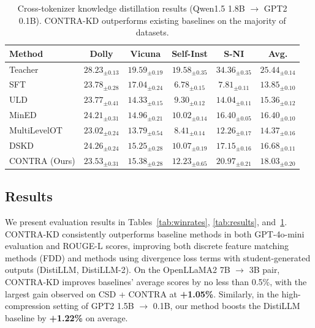 \documentclass{article} %
\theoremstyle{definition}
\theoremstyle{remark}
\begin{document}
\begin{table}[t]
\centering
\small
\caption{Cross-tokenizer knowledge distillation results (Qwen1.5 1.8B $\rightarrow$ GPT2 0.1B). CONTRA-KD outperforms existing baselines on the majority of datasets.}
\label{tab:ctkd_results}
\vspace{0.5em}
\begin{tabular}{lccccc}
\toprule
\textbf{Method} & \textbf{Dolly} & \textbf{Vicuna} & \textbf{Self-Inst} & \textbf{S-NI} & \textbf{Avg.} \\
\midrule
Teacher & $28.23_{\pm 0.13}$ & $19.59_{\pm 0.19}$ & $19.58_{\pm 0.35}$ & $34.36_{\pm 0.35}$ & $25.44_{\pm 0.14}$ \\
SFT & $23.78_{\pm 0.28}$ & $17.04_{\pm 0.24}$ & $6.78_{\pm 0.15}$ & $7.81_{\pm 0.11}$ & $13.85_{\pm 0.10}$ \\
\midrule
ULD & $23.77_{\pm 0.41}$ & $14.33_{\pm 0.15}$ & $9.30_{\pm 0.12}$ & $14.04_{\pm 0.11}$ & $15.36_{\pm 0.12}$ \\
MinED & $24.21_{\pm 0.31}$ & $14.96_{\pm 0.21}$ & $10.02_{\pm 0.14}$ & $16.40_{\pm 0.05}$ & $16.40_{\pm 0.10}$ \\
MultiLevelOT & $23.02_{\pm 0.24}$ & $13.79_{\pm 0.54}$ & $8.41_{\pm 0.14}$ & $12.26_{\pm 0.17}$ & $14.37_{\pm 0.16}$ \\
DSKD & $\mathbf{24.26}_{\pm 0.24}$ & $15.25_{\pm 0.28}$ & $10.07_{\pm 0.19}$ & $17.15_{\pm 0.16}$ & $16.68_{\pm 0.11}$ \\
CONTRA (Ours) & $23.53_{\pm 0.31}$ & $\mathbf{15.38}_{\pm 0.28}$ & $\mathbf{12.23}_{\pm 0.65}$ & $\mathbf{20.97}_{\pm 0.21}$ & $\mathbf{18.03}_{\pm 0.20}$ \\
\bottomrule
\end{tabular}
\end{table}
\subsection{Results}

We present evaluation results in Tables~\ref{tab:winrates}, \ref{tab:results}, and~\ref{tab:ctkd_results}. CONTRA-KD consistently outperforms baseline methods in both GPT-4o-mini evaluation and ROUGE-L scores, improving both discrete feature matching methods (FDD) and methods using divergence loss terms with student-generated outputs (DistiLLM, DistiLLM-2). On the OpenLLaMA2 7B $\to$ 3B pair, CONTRA-KD improves baselines' average scores by no less than 0.5\%, with the largest gain observed on CSD + CONTRA at \textbf{+1.05\%}. Similarly, in the high-compression setting of GPT2 1.5B $\to$ 0.1B, our method boosts the DistiLLM baseline by \textbf{+1.22\%} on average.
\end{document}
